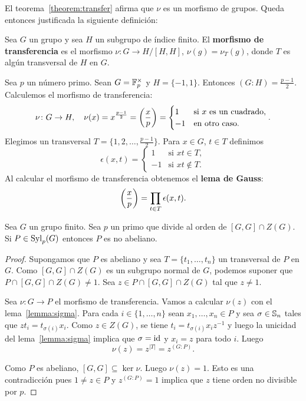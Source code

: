 El teorema~\ref{theorem:transfer} afirma que $\nu$ es un morfismo de grupos.
Queda entonces justificada la siguiente definición:


\begin{definition}
	Sea $G$ un grupo y sea $H$ un subgrupo de índice finito. El
	\textbf{morfismo de transferencia} es el morfismo $\nu\colon G\to H/[H,H]$,
	$\nu(g)=\nu_T(g)$, donde $T$ es algún transversal de $H$ en $G$.
\end{definition}

\begin{example}
	Sea $p$ un número primo. Sean $G=\mathbb{F}_p^\times$ y $H=\{-1,1\}$. Entonces
	$(G:H)=\frac{p-1}{2}$. Calculemos el morfismo de transferencia:
	\[
		\nu\colon G\to H,\quad
		\nu(x)=x^{\frac{p-1}{2}}=\left(\frac{x}{p}\right)=\begin{cases}
			1 & \text{si $x$ es un cuadrado},\\
			-1 & \text{en otro caso}.
		\end{cases}.
	\]
	Elegimos un transversal $T=\{1,2,\dots,\frac{p-1}{2}\}$. Para $x\in G$, $t\in T$ definimos
	\[
	\epsilon(x,t)=\begin{cases}
		1 & \text{si $xt\in T$},\\
		-1 & \text{si $xt\not\in T$}.
	\end{cases}
	\]
	Al calcular el morfismo de transferencia obtenemos el \textbf{lema de
	Gauss}:
	\[
	\left(\frac{x}{p}\right)=\prod_{t\in T}\epsilon(x,t).
	\]
\end{example}

\begin{theorem}
	\label{theorem:P_noabeliano}
	Sea $G$ un grupo finito. Sea $p$ un primo que divide al orden de $[G,G]\cap
	Z(G)$. Si $P\in\mathrm{Syl}_p(G)$ entonces $P$ es no abeliano.
\end{theorem}

\begin{proof}
	Supongamos que $P$ es abeliano y sea $T=\{t_1,\dots,t_n\}$ un transversal
	de $P$ en $G$. Como $[G,G]\cap Z(G)$ es un subgrupo normal de $G$, podemos
	suponer que $P\cap [G,G]\cap Z(G)\ne1$. Sea $z\in P\cap [G,G]\cap Z(G)$ tal
	que $z\ne1$. 

	Sea $\nu\colon G\to P$ el morfismo de transferencia. Vamos a calcular
	$\nu(z)$ con el lema~\ref{lemma:sigma}. Para cada $i\in\{1,\dots,n\}$ sean
	$x_1,\dots,x_n\in P$ y sea $\sigma\in\mathbb{S}_n$ tales que
	$zt_i=t_{\sigma(i)}x_i$. Como $z\in Z(G)$, se tiene
	$t_i=t_{\sigma(i)}x_iz^{-1}$ y luego la unicidad del lema~\ref{lemma:sigma}
	implica que $\sigma=\operatorname{id}$ y $x_i=z$ para todo $i$. Luego 
	\[
	\nu(z)=z^{|T|}=z^{(G:P)}. 
	\]

	Como $P$ es abeliano, $[G,G]\subseteq\ker\nu$. Luego $\nu(z)=1$. Esto es
	una contradicción pues $1\ne z\in P$ y $z^{(G:P)}=1$ implica que $z$ tiene
	orden no divisible por $p$. 
\end{proof}

